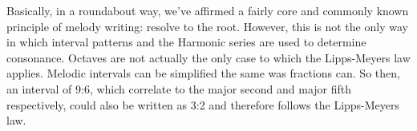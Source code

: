 \begin{table}[h!]
  \centering
  \caption{The relationship between Harmonic and 12TET intervals}
  \label{Tab:harmonic_intervals}
\end{table}

Basically, in a roundabout way, we've affirmed a fairly core and commonly known principle of
melody writing: resolve to the root. However, this is not the only way in which interval patterns
and the Harmonic series are used to determine consonance. Octaves are not actually the only case to
which the Lipps-Meyers law applies. Melodic intervals can be simplified the same was fractions can.\autocite{intervals}
So then, an interval of 9:6, which correlate to the major second and major fifth respectively, could
also be written as 3:2 and therefore follows the Lipps-Meyers law.

